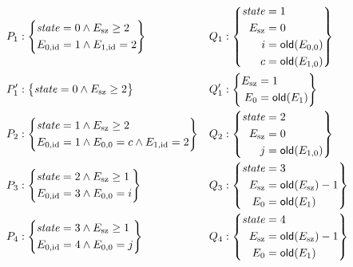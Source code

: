 \documentclass{article} %
\begin{document}
\begin{align*}
P_1&:\left\{\begin{aligned}
    &{\it state}=0 \land E_{\rm sz}\ge2 \\
    &E_{0,{\rm id}}=1 \land E_{1,{\rm id}}=2
    \end{aligned}\right\}
  &Q_1&:\left\{\begin{aligned}
    {\it state}&=1\\
    E_{\rm sz}&=0\\
    i&={\sf old}(E_{0,0})\\
    c&={\sf old}(E_{1,0})
    \end{aligned}\right\}\\
P'_1&:\left\{\begin{aligned}
    {\it state}=0 \land E_{\rm sz}\ge2
    \end{aligned}\right\}
  &Q'_1&:\left\{\begin{aligned}
  E_{\rm sz}&=1\\
  E_0&={\sf old}(E_1)
  \end{aligned}\right\} \\
P_2&:\left\{\begin{aligned}
    &{\it state}=1 \land E_{\rm sz}\ge2\\
    &E_{0,{\rm id}}=1 \land E_{0,0}=c \land E_{1,{\rm id}}=2
    \end{aligned}\right\}
  &Q_2&:\left\{\begin{aligned}
    {\it state}&=2\\
    E_{\rm sz}&=0\\
    j&={\sf old}(E_{1,0})
    \end{aligned}\right\}\\
P_3&:\left\{\begin{aligned}
    &{\it state}=2 \land E_{\rm sz}\ge1 \\
    &E_{0,{\rm id}}=3 \land E_{0,0}=i
    \end{aligned}\right\}
  &Q_3&:\left\{\begin{aligned}
    {\it state}&=3\\
    E_{\rm sz}&={\sf old}(E_{\rm sz})-1\\
    E_0&={\sf old}(E_1)
    \end{aligned}\right\}\\
P_4&:\left\{\begin{aligned}
    &{\it state}=3 \land E_{\rm sz}\ge1\\
    &E_{0,{\rm id}}=4 \land E_{0,0}=j
    \end{aligned}\right\}
  &Q_4&:\left\{\begin{aligned}
    {\it state}&=4\\
    E_{\rm sz}&={\sf old}(E_{\rm sz})-1\\
    E_0&={\sf old}(E_1)
    \end{aligned}\right\}
\end{align*}
\end{document}
